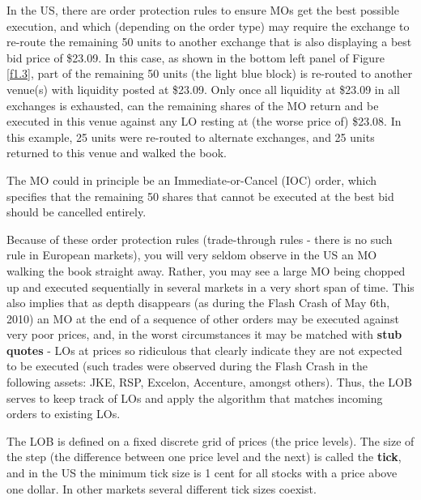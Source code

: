 \documentclass[11pt]{article}
\begin{document}
In the US, there are order protection rules to ensure MOs get the best possible execution, and which
(depending on the order type) may require the exchange to re-route the remaining 50 units to another
exchange that is also displaying a best bid price of \$23.09. In this case, as shown in the bottom left
panel of Figure \ref{f1.3}, part of the remaining 50 units (the light blue block) is re-routed to
another venue(s) with liquidity posted at \$23.09. Only once all liquidity at \$23.09 in all exchanges
is exhausted, can the remaining shares of the MO return and be executed in this venue against any LO
resting at (the worse price of) \$23.08. In this example, 25 units were re-routed to alternate
exchanges, and 25 units returned to this venue and walked the  book.

The MO could in principle be an Immediate-or-Cancel (IOC) order, which specifies that the remaining 50
shares that cannot be executed at the best bid should be cancelled entirely.

Because of these order protection rules (trade-through rules - there is no such rule in European
markets), you will very seldom observe in the US an MO walking the book straight away. Rather, you may
see a large MO being chopped up and executed sequentially in several markets in a very short span of
time. This also implies that as depth disappears (as during the Flash Crash of May 6th, 2010) an MO at
the end of a sequence of other orders may be executed against very poor prices, and, in the worst
circumstances it may be matched with \textbf{stub quotes} - LOs at prices so ridiculous that clearly indicate
they are not expected to be executed (such trades were observed during the Flash Crash in the
following assets: JKE, RSP, Excelon, Accenture, amongst others). Thus, the LOB serves to keep track of
LOs and apply the algorithm that matches incoming orders to existing LOs.

The LOB is defined on a fixed discrete grid of prices (the price levels). The size of the step (the
difference between one price level and the next) is called the \textbf{tick}, and in the US the minimum tick
size is 1 cent for all stocks with a price above one dollar. In other markets several different tick
sizes coexist.
\end{document}
